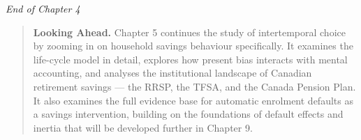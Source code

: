 \documentclass[12pt, letterpaper]{article}
\begin{document}
\medskip

\textit{End of Chapter 4}

\medskip

\begin{quote}
\textbf{Looking Ahead.} Chapter 5 continues the study of intertemporal choice by zooming in on household savings behaviour specifically. It examines the life-cycle model in detail, explores how present bias interacts with mental accounting, and analyses the institutional landscape of Canadian retirement savings --- the RRSP, the TFSA, and the Canada Pension Plan. It also examines the full evidence base for automatic enrolment defaults as a savings intervention, building on the foundations of default effects and inertia that will be developed further in Chapter 9.
\end{quote}
\end{document}
